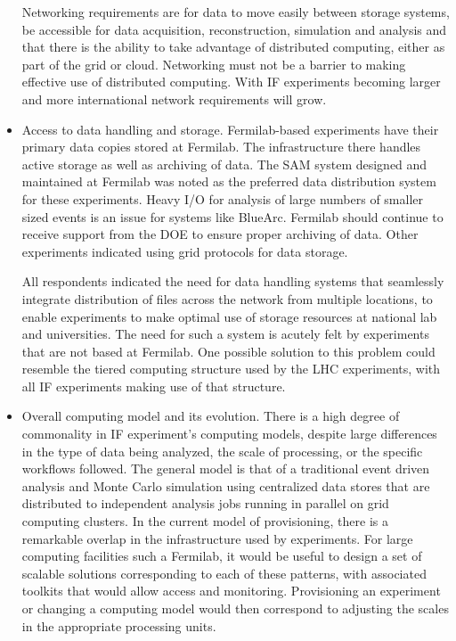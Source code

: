 \begin{itemize}
Networking requirements are for data to move easily between storage systems,
be accessible for data acquisition, reconstruction, simulation and analysis
and that there is the ability to take advantage of distributed computing,
either as part of the grid or cloud.  Networking must not be a barrier to
making effective use of distributed computing. With IF experiments becoming
larger and more international network requirements will grow.

\item Access to data handling and storage.   Fermilab-based experiments have
their primary data copies stored at Fermilab.  The infrastructure there
handles active storage as well as archiving of data.  The SAM system designed
and maintained at Fermilab was noted as the preferred data distribution system
for these experiments. Heavy I/O for analysis of large numbers of smaller
sized events is an issue for systems like BlueArc. Fermilab should continue to
receive support from the DOE to ensure proper archiving of data. Other
experiments indicated using grid protocols for data storage.

All respondents indicated the need for data handling systems that seamlessly
integrate distribution of files across the network from multiple locations, to
enable experiments to make optimal use of storage resources at national lab
and universities.  The need for such a system is acutely felt by experiments
that are not based at Fermilab.  One possible solution to this problem could
resemble the tiered computing structure used by the LHC experiments, with all
IF experiments making use of that structure.


\item Overall computing model and its evolution.  There is a high degree of
commonality in IF experiment's computing models, despite large differences in
the type of data being analyzed, the scale of processing, or the specific
workflows followed.   The general model is that of a traditional event driven
analysis and Monte Carlo simulation using centralized data stores that are
distributed to independent analysis jobs running in parallel on grid computing
clusters.  In the current model of provisioning, there is a remarkable overlap
in the infrastructure used by experiments. For large computing facilities such
a Fermilab, it would be useful to design a set of scalable solutions
corresponding to each of these patterns, with associated toolkits that would
allow access and monitoring. Provisioning an experiment or changing a
computing model would then correspond to adjusting the scales in the
appropriate processing units.


\end{itemize}
